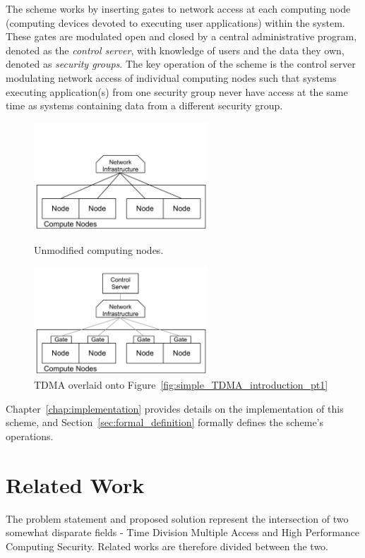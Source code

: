 \documentclass[oneside,12pt]{memoir}
\begin{document}
The scheme works by inserting gates to network access at each computing node (computing devices devoted to executing user applications) within the system. These gates are modulated open and closed by a central administrative program, denoted as the \textit{control server}, with knowledge of users and the data they own, denoted as \textit{security groups}. The key operation of the scheme is the control server modulating network access of individual computing nodes such that systems executing application(s) from one security group never have access at the same time as systems containing data from a different security group.

\begin{figure}
\centering
\begin{minipage}{6.5cm}
\includegraphics[width=6.5cm]{Simple_TDMA_Introduction_pt1.pdf}
\caption{Unmodified computing nodes.}
\label{fig:simple_TDMA_introduction_pt1}
\end{minipage}
\hspace{1em}
\begin{minipage}{6.5cm}
\includegraphics[width=6.5cm]{Simple_TDMA_Introduction_pt2.pdf}
\caption{TDMA overlaid onto Figure~\ref{fig:simple_TDMA_introduction_pt1}}
\label{fig:simple_TDMA_introduction_pt2}
\end{minipage}
\end{figure}

Chapter~\ref{chap:implementation} provides details on the implementation of this scheme, and Section~\ref{sec:formal_definition} formally defines the scheme's operations.
\chapter{Related Work}
The problem statement and proposed solution represent the intersection of two somewhat disparate fields - Time Division Multiple Access and High Performance Computing Security. Related works are therefore divided between the two. 
\end{document}
